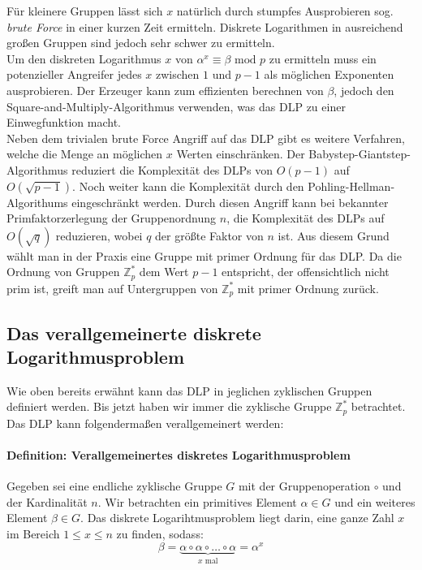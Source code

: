 Für kleinere Gruppen lässt sich $x$ natürlich durch stumpfes Ausprobieren sog. \textit{brute Force} in einer kurzen Zeit ermitteln. Diskrete Logarithmen in ausreichend großen Gruppen sind jedoch sehr schwer zu ermitteln.\\

Um den diskreten Logarithmus $x$ von $\alpha^x \equiv \beta \text{ mod } p$ zu ermitteln muss ein potenzieller Angreifer jedes $x$ zwischen $1$ und $p-1$ als möglichen Exponenten ausprobieren. Der Erzeuger kann zum effizienten berechnen von $\beta$, jedoch den Square-and-Multiply-Algorithmus verwenden, was das DLP zu einer Einwegfunktion macht.\\

Neben dem trivialen brute Force Angriff auf das DLP gibt es weitere Verfahren, welche die Menge an möglichen $x$ Werten einschränken. Der Babystep-Giantstep-Algorithmus reduziert die Komplexität des DLPs von $O(p-1)$ auf $O(\sqrt{p-1})$. Noch weiter kann die Komplexität durch den Pohling-Hellman-Algorithums eingeschränkt werden. Durch diesen Angriff kann bei bekannter Primfaktorzerlegung der Gruppenordnung $n$, die Komplexität des DLPs auf $O(\sqrt{q})$ reduzieren, wobei $q$ der größte Faktor von $n$ ist. Aus diesem Grund wählt man in der Praxis eine Gruppe mit primer Ordnung für das DLP. Da die Ordnung von Gruppen $\mathbb{Z}^*_p$ dem Wert $p-1$ entspricht, der offensichtlich nicht prim ist, greift man auf Untergruppen von $\mathbb{Z}^*_p$ mit primer Ordnung zurück.\cite{Paar.2016}

\subsection{Das verallgemeinerte diskrete Logarithmusproblem} \label{sec:DLP}
Wie oben bereits erwähnt kann das DLP in jeglichen zyklischen Gruppen definiert werden. Bis jetzt haben wir immer die zyklische Gruppe $\mathbb{Z}^*_p$ betrachtet. Das DLP kann folgendermaßen verallgemeinert werden:

\paragraph{Definition: Verallgemeinertes diskretes Logarithmusproblem}
Gegeben sei eine endliche zyklische Gruppe $G$ mit der Gruppenoperation $\circ$ und der Kardinalität $n$. Wir betrachten ein primitives Element $\alpha \in G$ und ein weiteres Element $\beta \in G$. Das diskrete Logarihtmusproblem liegt darin, eine ganze Zahl $x$ im Bereich $1 \leq x \leq n$ zu finden, sodass:
$$\beta = \underbrace{\alpha \circ \alpha \circ \dots \circ \alpha}_{\text{$x$ mal}} = \alpha^x$$\\

